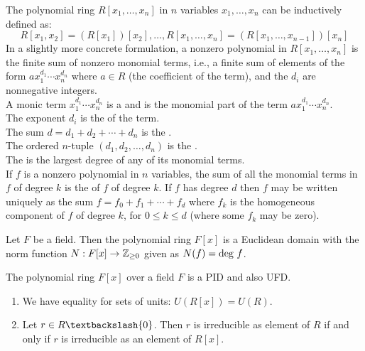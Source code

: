 \begin{definition}
The polynomial ring $R[x_1, \ldots, x_n]$ in $n$ variables $x_1, \ldots, x_n$ can be inductively defined as:
\begin{equation}
R[x_1, x_2] = (R[x_1])[x_2], \ldots, R[x_1, \ldots, x_n] = (R[x_1, \ldots, x_{n-1}])[x_n] \nonumber
\end{equation}
In a slightly more concrete formulation, a nonzero polynomial in $R[x_1, \ldots, x_n]$ is the finite sum of nonzero monomial terms, i.e., a finite sum of elements of the form $ax_1^{d_1} \cdots x_n^{d_n}$ where $a\in R$ (the coefficient of the term), and the $d_i$ are nonnegative integers.\\
A monic term $x_1^{d_1} \cdots x_n^{d_n}$ is a  and is the monomial part of the term $ax_1^{d_1} \cdots x_n^{d_n}$.\\
The exponent $d_i$ is the  of the term.\\
The sum $d=d_1 + d_2 + \cdots + d_n$ is the .\\
The ordered $n$-tuple $(d_1, d_2, \ldots, d_n)$ is the .\\
The  is the largest degree of any of its monomial terms.\\
If $f$ is a nonzero polynomial in $n$ variables, the sum of all the monomial terms in $f$ of degree $k$ is the  of $f$ of degree $k$. If $f$ has degree $d$ then $f$ may be written uniquely as the sum $f = f_0 + f_1 + \cdots + f_d$ where $f_k$ is the homogeneous component of $f$ of degree $k$, for $0 \leq k \leq d$ (where some $f_k$ may be zero).
\end{definition}

\begin{theorem}
Let $F$ be a field. Then the polynomial ring $F[x]$ is a Euclidean domain with the norm function $N:F[x] \rightarrow \mathbb{Z}_{\geq 0}$ given as $N(f) = \textnormal{deg}\ f$.
\end{theorem}

\begin{corollary}
The polynomial ring $F[x]$ over a field $F$ is a PID and also UFD.
\end{corollary}

\begin{lemma}
\begin{enumerate}[label=(\roman*)]
\item We have equality for sets of units: $U(R[x]) = U(R)$.
\item Let $r \in R \textbackslash \{0\}$. Then $r$ is irreducible as element of $R$ if and only if $r$ is irreducible as an element of $R[x]$.
\end{enumerate}
\end{lemma}

